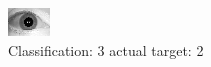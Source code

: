 \begin{figure}[h!]
\begin{center}
\includegraphics[width=0.60\columnwidth]{figures/ID1637_class_3_target_2.png}
\end{center}
\caption{ Classification: 3 actual target: 2}
\label{fig:ID1637_class_3_target_2}
\end{figure}
